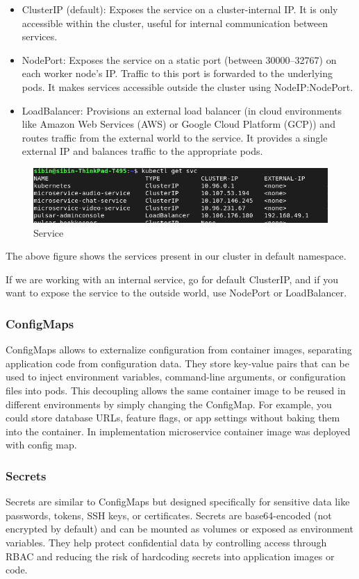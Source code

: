 \begin{itemize}
    \item ClusterIP (default): Exposes the service on a cluster-internal IP. It is only accessible within the cluster, useful for internal communication between services.
    \item NodePort: Exposes the service on a static port (between 30000–32767) on each worker node's IP. Traffic to this port is forwarded to the underlying pods. It makes services accessible outside the cluster using  NodeIP:NodePort.
    \item LoadBalancer: Provisions an external load balancer (in cloud environments like Amazon Web Services (AWS) or Google Cloud Platform (GCP)) and routes traffic from the external world to the service. It provides a single external IP and balances traffic to the appropriate pods.
\end{itemize}

\begin{figure}[H]
\caption{Service}
\centering
\includegraphics[width=1\textwidth]{SOA/k_svc.png}
\end{figure}
The above figure shows the services present in our cluster in default namespace.


If we are working with an internal service, go for default ClusterIP, and if you want to expose the service to the outside world, use NodePort or LoadBalancer.

\subsubsection{ConfigMaps}
ConfigMaps allows to externalize configuration from container images, separating application code from configuration data. They store key-value pairs that can be used to inject environment variables, command-line arguments, or configuration files into pods. This decoupling allows the same container image to be reused in different environments by simply changing the ConfigMap. For example, you could store database URLs, feature flags, or app settings without baking them into the container. In implementation microservice container image was deployed with config map.

\subsubsection{Secrets}
Secrets are similar to ConfigMaps but designed specifically for sensitive data like passwords, tokens, SSH keys, or certificates. Secrets are base64-encoded (not encrypted by default) and can be mounted as volumes or exposed as environment variables. They help protect confidential data by controlling access through RBAC and reducing the risk of hardcoding secrets into application images or code.

